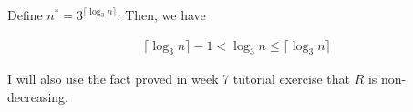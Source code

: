 \documentclass[12pt]{article}
\begin{document}
\begin{itemize}
\begin{itemize}
        \begin{mdframed}
        Define $n^* = 3^{\lceil \log_3 n \rceil}$.
        Then, we have

        \begin{align}
            \lceil \log_3 n \rceil - 1 < \log_3 n \leq \lceil \log_3 n \rceil
        \end{align}

        \bigskip

        I will also use the fact proved in week 7 tutorial exercise that
        $R$ is non-decreasing.
        \end{mdframed}
    \end{itemize}



















\end{itemize}
\end{document}
